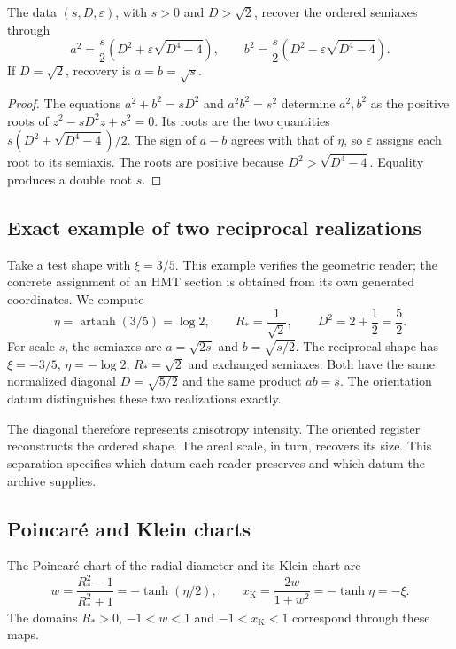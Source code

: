 \begin{corollary}
\label{hrr:semiejes-recuperacion} The data \((s,D,\varepsilon)\), with \(s>0\) and \(D>\sqrt2\), recover the ordered semiaxes through
\begin{equation}
 a^2=\frac{s}{2}\left(D^2+\varepsilon\sqrt{D^4-4}\right),
 \qquad
 b^2=\frac{s}{2}\left(D^2-\varepsilon\sqrt{D^4-4}\right).
 \label{hrr:semiejes-radicales}
\end{equation}
If \(D=\sqrt2\), recovery is \(a=b=\sqrt{s}\).
\end{corollary}
\begin{proof}
The equations \(a^2+b^2=sD^2\) and \(a^2b^2=s^2\) determine \(a^2,b^2\) as the positive roots of \(z^2-sD^2z+s^2=0\). Its roots are the two quantities \(s(D^2\pm\sqrt{D^4-4})/2\). The sign of \(a-b\) agrees with that of \(\eta\), so \(\varepsilon\) assigns each root to its semiaxis. The roots are positive because \(D^2>\sqrt{D^4-4}\). Equality produces a double root \(s\).
\end{proof}

\subsection{Exact example of two reciprocal realizations}

Take a test shape with \(\xi=3/5\). This example verifies the geometric reader; the concrete assignment of an HMT section is obtained from its own generated coordinates. We compute
\[
 \eta=\operatorname{artanh}(3/5)=\log2,\qquad
 R_*=\frac1{\sqrt2},\qquad
 D^2=2+\frac12=\frac52.
\]
For scale \(s\), the semiaxes are \(a=\sqrt{2s}\) and \(b=\sqrt{s/2}\). The reciprocal shape has \(\xi=-3/5\), \(\eta=-\log2\), \(R_*=\sqrt2\) and exchanged semiaxes. Both have the same normalized diagonal \(D=\sqrt{5/2}\) and the same product \(ab=s\). The orientation datum distinguishes these two realizations exactly.

The diagonal therefore represents anisotropy intensity. The oriented register reconstructs the ordered shape. The areal scale, in turn, recovers its size. This separation specifies which datum each reader preserves and which datum the archive supplies.

\subsection{Poincaré and Klein charts}

The Poincaré chart of the radial diameter and its Klein chart are
\begin{equation}
 w=\frac{R_*^2-1}{R_*^2+1}
   =-\tanh(\eta/2),\qquad
 x_{\mathrm K}=\frac{2w}{1+w^2}=-\tanh\eta=-\xi.
 \label{hrr:cartas}
\end{equation}
The domains \(R_*>0\), \(-1<w<1\) and \(-1<x_{\mathrm K}<1\) correspond through these maps.

